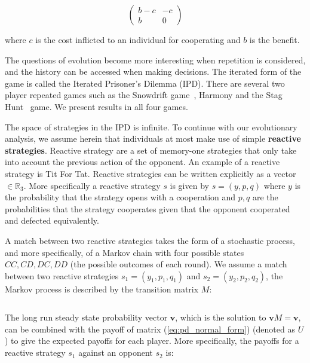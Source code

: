 \documentclass[11pt]{article}
\newcommand{\R}{\mathbb{R}}
\theoremstyle{plainCl1}
\theoremstyle{plainCl2}
\begin{document}
\begin{equation}\label{eq:donation_normal_form}
    \begin{pmatrix}
        b-c & -c  \\
        b & 0
    \end{pmatrix}
\end{equation}

where \(c\) is the cost inflicted to an individual for cooperating and \(b\) is
the benefit.

The questions of evolution become more interesting when repetition is considered,
and the history can be accessed when making decisions. The iterated form of the
game is called the Iterated Prisoner's Dilemma (IPD). There are several two
player repeated games such as the Snowdrift game~\cite{sugden2004economics},
Harmony and the Stag Hunt~\cite{skyrms2001stag} game. We present results in all
four games.

The space of strategies in the IPD is infinite. To continue with our
evolutionary analysis, we assume herein that individuals at most make use of
simple \textbf{reactive strategies}. Reactive strategy are a set of memory-one
strategies that only take into account the previous action of the opponent. An
example of a reactive strategy is Tit For Tat. Reactive strategies can be
written explicitly as a vector \(\in \R_{3}\). More specifically a reactive
strategy \(s\) is given by \(s=(y, p, q)\) where \(y\) is the probability that
the strategy opens with a cooperation and \(p, q\) are the probabilities that
the strategy cooperates given that the opponent cooperated and defected
equivalently.

A match between two reactive strategies takes the form of a stochastic process,
and more specifically, of a Markov chain with four possible states \(CC, CD, DC,
DD\) (the possible outcomes of each round). We assume a match between two
reactive strategies \(s_{1}=(y_{1}, p_{1}, q_{1})\) and \(s_{2}=(y_{2}, p_{2},
q_{2})\), the Markov process is described by the transition matrix \(M\):

\begin{equation}
    
\end{equation}

The long run steady state probability vector \(\mathbf{v}\), which is the
solution to \(\mathbf{v} M = \mathbf{v}\), can be combined with the payoff of
matrix (\ref{eq:pd_normal_form}) (denoted as \(U\)) to give the expected payoffs
for each player. More specifically, the payoffs for a reactive strategy \(s_1\)
against an opponent \(s_2\) is:
\end{document}
